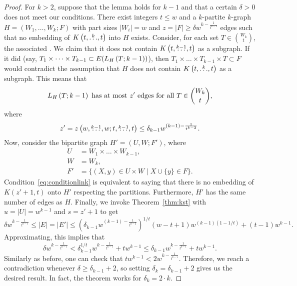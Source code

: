 \begin{lemma}
\begin{proof}
        For $k > 2$, suppose that the lemma holds for $k - 1$ and that
        a certain $\delta > 0$ does not meet our conditions.
        There exist integers $t \leq w$ and a $k$-partite $k$-graph $H=(W_1, \dots, W_k; F)$
        with part sizes $|W_i| = w$ and $z = |F| \geq \delta w^{k - \frac{1}{t^{k-1}}}$ edges
        such that no embedding of $K\left(t, \overset{k}{\dots}, t\right)$ into $H$ exists.
        Consider, for each set $T \in \binom{W_k}{t}$, the associated 
        .
        We claim that it does not contain $K\left(t, \overset{k-1}{\dots}, t\right)$ as a subgraph.
        If it did (say, $T_1 \times \dots \times T_{k-1} \subset E(L_{H}\left(T; k-1\right))$),
        then $T_1 \times \dots \times T_{k-1} \times T \subset F$
        would contradict the assumption that $H$ does not contain $K\left(t, \overset{k}{\dots}, t\right)$ as a subgraph.
        This means that
        \begin{equation} \label{eq:conditionlink}
            L_{H}\left(T; k-1\right) \text{ has at most $z'$ edges for all } T \in \binom{W_k}{t},
        \end{equation}
        where
        \[
            z' = z\left(w, \overset{k-1}{\dots}, w; t, \overset{k-1}{\dots}, t\right) \leq \delta_{k-1} w^{(k - 1) - \frac{1}{t^{k-2}}}.
        \]
        Now, consider the bipartite graph $H' = (U, W; F')$, where
        \begin{align*}
            U &= W_1 \times \dots \times W_{k-1}, \\
            W &= W_k, \\
            F' &= \{(X, y) \in U \times W \mid X \cup \{y\} \in F\}.
        \end{align*}
        Condition~\eqref{eq:conditionlink} is equivalent to saying that
        there is no embedding of $K(z' + 1, t)$ onto $H'$ respecting the partitions.
        Furthermore, $H'$ has the same number of edges as $H$.
        Finally, we invoke Theorem~\ref{thm:kst} with
        ${u = |U| = w^{k-1}}$ and
        ${s = z' + 1}$ to get
        \begin{equation} \label{eq:erdos64_induction}
            \delta w^{k - \frac{1}{t^{k-1}}} \leq
            |E| = |E'| \leq
            \left(\delta_{k-1} w^{(k - 1) - \frac{1}{t^{k-2}}}\right)^{1 / t}(w - t + 1)w^{(k-1)(1 - 1 / t)} + (t - 1)w^{k-1}.
        \end{equation}
        Approximating, this implies that
        \[
            \delta w^{k - \frac{1}{t^{k-1}}} < \delta_{k-1}^{1 / t} w^{k - \frac{1}{t^{k-1}}} + tw^{k-1} \leq \delta_{k-1}w^{k - \frac{1}{t^{k-1}}} + tw^{k-1}.
        \]
        Similarly as before, one can check that $tw^{k-1} < 2w^{k-\frac{1}{t^{k-1}}}$.
        Therefore, we reach a contradiction whenever $\delta \geq \delta_{k-1} + 2$,
        so setting $\delta_k = \delta_{k-1} + 2$ gives us the desired result.
        In fact, the theorem works for $\delta_k = 2 \cdot k$.

    \end{proof}
\end{lemma}

